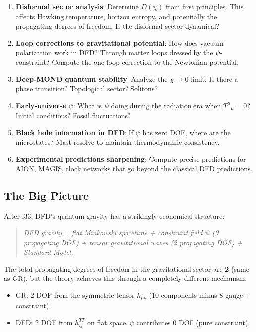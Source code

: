 \documentclass[11pt,a4paper]{article}
\begin{document}
\begin{enumerate}
\item \textbf{Disformal sector analysis}: Determine $D(\chi)$ from first principles. This affects Hawking temperature, horizon entropy, and potentially the propagating degrees of freedom. Is the disformal sector dynamical?

\item \textbf{Loop corrections to gravitational potential}: How does vacuum polarization work in DFD? Through matter loops dressed by the $\psi$-constraint? Compute the one-loop correction to the Newtonian potential.

\item \textbf{Deep-MOND quantum stability}: Analyze the $\chi \to 0$ limit. Is there a phase transition? Topological sector? Solitons?

\item \textbf{Early-universe $\psi$}: What is $\psi$ doing during the radiation era when $T^\mu{}_\mu = 0$? Initial conditions? Fossil fluctuations?

\item \textbf{Black hole information in DFD}: If $\psi$ has zero DOF, where are the microstates? Must resolve to maintain thermodynamic consistency.

\item \textbf{Experimental predictions sharpening}: Compute precise predictions for AION, MAGIS, clock networks that go beyond the classical DFD predictions.
\end{enumerate}

\subsection{The Big Picture}

After i33, DFD's quantum gravity has a strikingly economical structure:

\begin{quote}
\textit{DFD gravity = flat Minkowski spacetime + constraint field $\psi$ (0 propagating DOF) + tensor gravitational waves (2 propagating DOF) + Standard Model.}
\end{quote}

The total propagating degrees of freedom in the gravitational sector are \textbf{2} (same as GR), but the theory achieves this through a completely different mechanism:
\begin{itemize}
\item GR: 2 DOF from the symmetric tensor $h_{\mu\nu}$ (10 components minus 8 gauge + constraint).
\item DFD: 2 DOF from $h_{ij}^{TT}$ on flat space. $\psi$ contributes 0 DOF (pure constraint).
\end{itemize}
\end{document}
